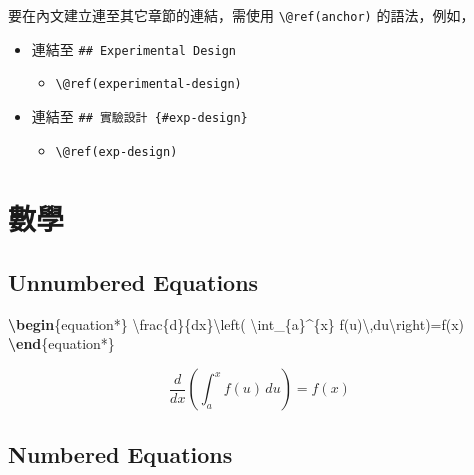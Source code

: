 \documentclass[oneside]{book}
\newenvironment{Shaded}{\begin{snugshade}}{\end{snugshade}}
\newcommand{\ExtensionTok}[1]{#1}
\newcommand{\KeywordTok}[1]{\textcolor[rgb]{0.13,0.29,0.53}{\textbf{#1}}}
\newcommand{\NormalTok}[1]{#1}
\newcommand{\SpecialCharTok}[1]{\textcolor[rgb]{0.00,0.00,0.00}{#1}}
\newcommand{\SpecialStringTok}[1]{\textcolor[rgb]{0.31,0.60,0.02}{#1}}
\providecommand{\tightlist}{%
  \setlength{\itemsep}{0pt}\setlength{\parskip}{0pt}}
\begin{document}
要在內文建立連至其它章節的連結，需使用 \texttt{\textbackslash{}@ref(anchor)} 的語法，例如，

\begin{itemize}
\tightlist
\item
  連結至 \texttt{\#\#\ Experimental\ Design}

  \begin{itemize}
  \tightlist
  \item
    \texttt{\textbackslash{}@ref(experimental-design)}
  \end{itemize}
\item
  連結至 \texttt{\#\#\ 實驗設計\ \{\#exp-design\}}

  \begin{itemize}
  \tightlist
  \item
    \texttt{\textbackslash{}@ref(exp-design)}
  \end{itemize}
\end{itemize}

\hypertarget{math}{%
\section{數學}\label{math}}

\hypertarget{unnumbered-equations}{%
\subsection{Unnumbered Equations}\label{unnumbered-equations}}

\begin{Shaded}
\begin{Highlighting}[]
\KeywordTok{\textbackslash{}begin}\NormalTok{\{}\ExtensionTok{equation*}\NormalTok{\}}\SpecialStringTok{ }
\SpecialCharTok{\textbackslash{}frac}\SpecialStringTok{\{d\}\{dx\}}\SpecialCharTok{\textbackslash{}left}\SpecialStringTok{( }\SpecialCharTok{\textbackslash{}int}\SpecialStringTok{_\{a\}^\{x\} f(u)}\SpecialCharTok{\textbackslash{},}\SpecialStringTok{du}\SpecialCharTok{\textbackslash{}right}\SpecialStringTok{)=f(x)}
\KeywordTok{\textbackslash{}end}\NormalTok{\{}\ExtensionTok{equation*}\NormalTok{\} }
\end{Highlighting}
\end{Shaded}

\begin{equation*} 
\frac{d}{dx}\left( \int_{a}^{x} f(u)\,du\right)=f(x)
\end{equation*}

\hypertarget{numbered-equations}{%
\subsection{Numbered Equations}\label{numbered-equations}}
\end{document}

